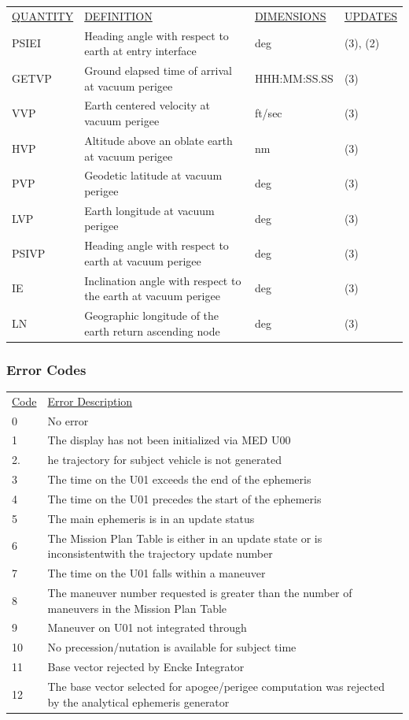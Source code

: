 \documentclass[11pt]{article} %
\begin{document}
\begin{center}
\begin{tabular}{ L{2.4cm} L{5.1cm} L{3cm} L{3.8cm} }
\underline{QUANTITY} & \underline{DEFINITION} & \underline{DIMENSIONS} & \underline{UPDATES} \\
PSIEI & Heading angle with respect to earth at entry interface & deg & (3), (2)\\
GETVP & Ground elapsed time of arrival at vacuum perigee & HHH:MM:SS.SS & (3)\\
VVP & Earth centered velocity at vacuum perigee & ft/sec & (3)\\
HVP & Altitude above an oblate earth at vacuum perigee & nm & (3)\\
PVP & Geodetic latitude at vacuum perigee & deg & (3)\\
LVP & Earth longitude at vacuum perigee & deg & (3)\\
PSIVP & Heading angle with respect to earth at vacuum perigee & deg & (3)\\
IE & Inclination angle with respect to the earth at vacuum perigee & deg & (3)\\
LN & Geographic longitude of the earth return ascending node & deg & (3)\\
\end{tabular}
\end{center}
\subsubsection{Error Codes}

\begin{tabular}{p{1cm} p{12cm}}
\underline{Code}&\underline{Error Description}\\
0&No error\\
1&The display has not been initialized via MED U00\\
2.&he trajectory for subject vehicle is not generated\\
3&The time on the U01 exceeds the end of the ephemeris\\
4&The time on the U01 precedes the start of the ephemeris\\
5&The main ephemeris is in an update status\\
6&The Mission Plan Table is either in an update state or is inconsistentwith the trajectory update number\\
7&The time on the U01 falls within a maneuver\\
8&The maneuver number requested is greater than the number of maneuvers in the Mission Plan Table\\
9&Maneuver on U01 not integrated through\\
10&No precession/nutation is available for subject time\\
11&Base vector rejected by Encke Integrator\\
12&The base vector selected for apogee/perigee computation was rejected by the analytical ephemeris generator\\
\end{tabular}
\newpage
\end{document}
